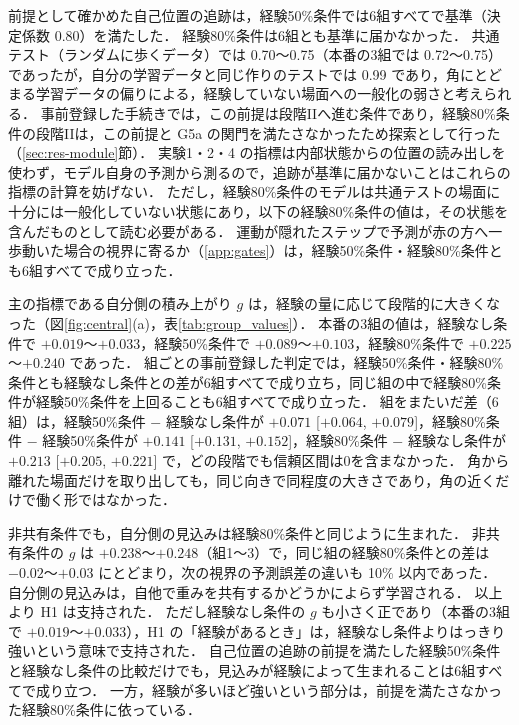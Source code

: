 前提として確かめた自己位置の追跡は，経験50\%条件では6組すべてで基準（決定係数 0.80）を満たした．
経験80\%条件は6組とも基準に届かなかった．
共通テスト（ランダムに歩くデータ）では 0.70〜0.75（本番の3組では 0.72〜0.75）であったが，自分の学習データと同じ作りのテストでは 0.99 であり，角にとどまる学習データの偏りによる，経験していない場面への一般化の弱さと考えられる．
事前登録した手続きでは，この前提は段階IIへ進む条件であり，経験80\%条件の段階IIは，この前提と G5a の関門を満たさなかったため探索として行った（\ref{sec:res-module}節）．
実験1・2・4 の指標は内部状態からの位置の読み出しを使わず，モデル自身の予測から測るので，追跡が基準に届かないことはこれらの指標の計算を妨げない．
ただし，経験80\%条件のモデルは共通テストの場面に十分には一般化していない状態にあり，以下の経験80\%条件の値は，その状態を含んだものとして読む必要がある．
運動が隠れたステップで予測が赤の方へ一歩動いた場合の視界に寄るか（\ref{app:gates}）は，経験50\%条件・経験80\%条件とも6組すべてで成り立った．

主の指標である自分側の積み上がり $g$ は，経験の量に応じて段階的に大きくなった（図\ref{fig:central}(a)，表\ref{tab:group_values}）．
本番の3組の値は，経験なし条件で $+0.019$〜$+0.033$，経験50\%条件で $+0.089$〜$+0.103$，経験80\%条件で $+0.225$〜$+0.240$ であった．
組ごとの事前登録した判定では，経験50\%条件・経験80\%条件とも経験なし条件との差が6組すべてで成り立ち，同じ組の中で経験80\%条件が経験50\%条件を上回ることも6組すべてで成り立った．
組をまたいだ差（6組）は，経験50\%条件 $-$ 経験なし条件が $+0.071$ [$+0.064$, $+0.079$]，経験80\%条件 $-$ 経験50\%条件が $+0.141$ [$+0.131$, $+0.152$]，経験80\%条件 $-$ 経験なし条件が $+0.213$ [$+0.205$, $+0.221$] で，どの段階でも信頼区間は0を含まなかった．
角から離れた場面だけを取り出しても，同じ向きで同程度の大きさであり，角の近くだけで働く形ではなかった．

非共有条件でも，自分側の見込みは経験80\%条件と同じように生まれた．
非共有条件の $g$ は $+0.238$〜$+0.248$（組1〜3）で，同じ組の経験80\%条件との差は $-0.02$〜$+0.03$ にとどまり，次の視界の予測誤差の違いも 10\% 以内であった．
自分側の見込みは，自他で重みを共有するかどうかによらず学習される．
以上より H1 は支持された．
ただし経験なし条件の $g$ も小さく正であり（本番の3組で $+0.019$〜$+0.033$），H1 の「経験があるとき」は，経験なし条件よりはっきり強いという意味で支持された．
自己位置の追跡の前提を満たした経験50\%条件と経験なし条件の比較だけでも，見込みが経験によって生まれることは6組すべてで成り立つ．
一方，経験が多いほど強いという部分は，前提を満たさなかった経験80\%条件に依っている．

